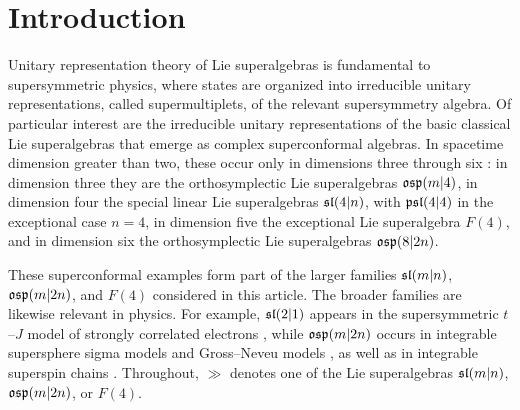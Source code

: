\section{Introduction}
\noindent Unitary representation theory of Lie superalgebras is fundamental to supersymmetric physics, where states are organized into irreducible unitary representations, called supermultiplets, of the relevant supersymmetry algebra. Of particular interest are the irreducible unitary representations of the basic classical Lie superalgebras that emerge as complex superconformal algebras. In spacetime dimension greater than two, these occur only in dimensions three through six \cite{Shnider}: in dimension three they are the orthosymplectic Lie superalgebras $\osp(m\vert4)$, in dimension four the special linear Lie superalgebras $\sl(4\vert n)$, with $\psl(4\vert4)$ in the exceptional case $n=4$, in dimension five the exceptional Lie superalgebra $F(4)$, and in dimension six the orthosymplectic Lie superalgebras $\osp(8\vert2n)$.

These superconformal examples form part of the larger families $\sl(m\vert n)$, $\osp(m\vert2n)$, and $F(4)$ considered in this article. The broader families are likewise relevant in physics. For example,  $\sl(2\vert1)$ appears in the supersymmetric $t$--$J$ model of strongly correlated electrons \cite{EsslerKorepin}, while $\osp(m\vert2n)$ occurs in integrable supersphere sigma models and Gross--Neveu models \cite{SaleurWehefritzKaufmann}, as well as in integrable superspin chains \cite{ArnaudonEtAl}. Throughout, $\gg$ denotes one of the Lie superalgebras $\sl(m\vert n)$, $\osp(m\vert2n)$, or $F(4)$.





